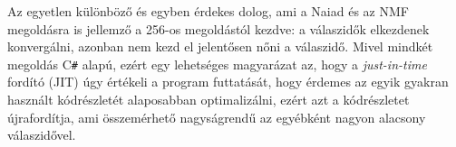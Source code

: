 Az egyetlen különböző és egyben érdekes dolog, ami a Naiad és az NMF megoldásra is jellemző a 256-os megoldástól kezdve: a válaszidők elkezdenek konvergálni, azonban nem kezd el jelentősen nőni a válaszidő. Mivel mindkét megoldás C\texttt{\#} alapú, ezért egy lehetséges magyarázat az, hogy a \emph{just-in-time} fordító (JIT) úgy értékeli a program futtatását, hogy érdemes az egyik gyakran használt kódrészletét alaposabban optimalizálni, ezért azt a kódrészletet újrafordítja, ami összemérhető nagyságrendű az egyébként nagyon alacsony válaszidővel.
